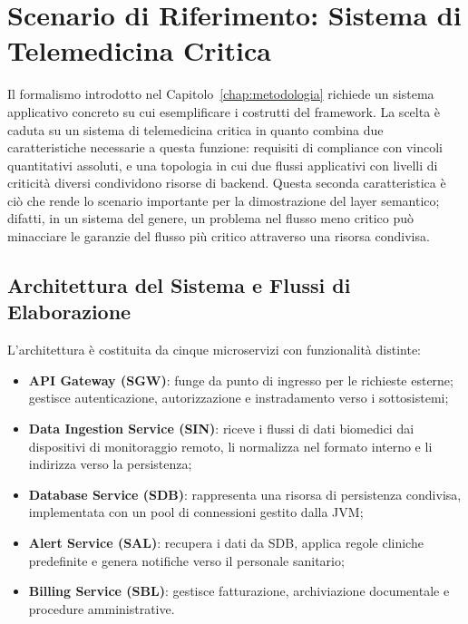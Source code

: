 \section{Scenario di Riferimento: Sistema di Telemedicina Critica}
\label{sec:scenario_riferimento}

Il formalismo introdotto nel Capitolo~\ref{chap:metodologia} richiede un sistema applicativo concreto su cui
esemplificare i costrutti del framework. La scelta è caduta su un sistema di telemedicina critica 
in quanto combina due caratteristiche necessarie a questa funzione: requisiti di compliance con vincoli 
quantitativi assoluti, e una topologia in cui due flussi applicativi con livelli di criticità diversi 
condividono risorse di backend. Questa seconda caratteristica è ciò che rende lo scenario importante 
per la dimostrazione del layer semantico; difatti, in un sistema del genere, un problema nel flusso meno 
critico può minacciare le garanzie del flusso più critico attraverso una risorsa condivisa.

\subsection{Architettura del Sistema e Flussi di Elaborazione}
\label{subsec:architettura_telemedicina}

L'architettura è costituita da cinque microservizi con funzionalità distinte:

\begin{itemize}
  \item \textbf{API Gateway (SGW)}: funge da punto di ingresso per le richieste esterne; 
      gestisce autenticazione, autorizzazione e instradamento verso i sottosistemi;
  \item \textbf{Data Ingestion Service (SIN)}: riceve i flussi di dati biomedici dai 
      dispositivi di monitoraggio remoto, li normalizza nel formato interno e li indirizza verso la persistenza; 
  \item \textbf{Database Service (SDB)}: rappresenta una risorsa di persistenza condivisa, 
      implementata con un pool di connessioni gestito dalla \gls{JVM};
  \item \textbf{Alert Service (SAL)}: recupera i dati da SDB, applica regole cliniche 
      predefinite e genera notifiche verso il personale sanitario;
  \item \textbf{Billing Service (SBL)}: gestisce fatturazione, archiviazione documentale 
      e procedure amministrative.
\end{itemize}

